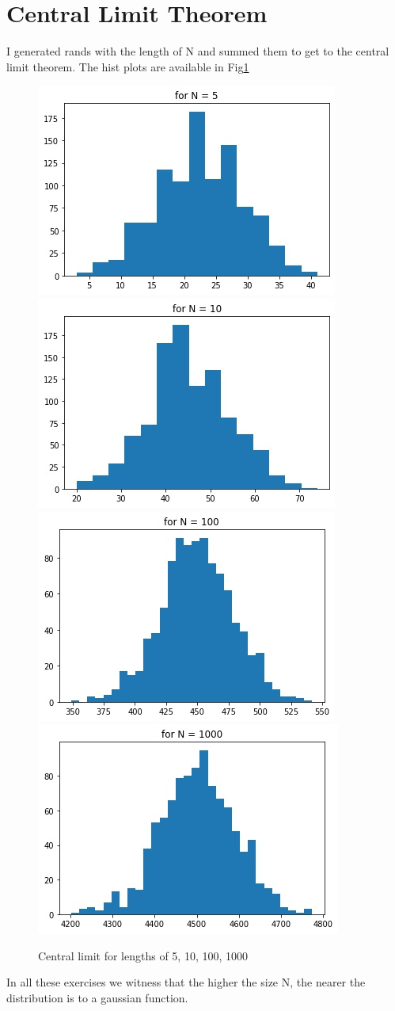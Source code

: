 \documentclass[12pt]{article}
\begin{document}
	\section{Central Limit Theorem}
	I generated rands with the length of N and summed them to get to the central limit theorem.
	The hist plots are available in Fig\ref{fig:p3}
	\begin{figure}[h!]
		\centering
		\includegraphics[width=.4\linewidth]{../p3_5.jpg}
		\includegraphics[width=.4\linewidth]{../p3_10.jpg}
		\includegraphics[width=.4\linewidth]{../p3_100.jpg}
		\includegraphics[width=.4\linewidth]{../p3_1000.jpg}
		\label{fig:p3}
		\caption{Central limit for lengths of 5, 10, 100, 1000}
	\end{figure}
	In all these exercises we witness that the higher the size N, the nearer the distribution is to a gaussian function.
\end{document}
